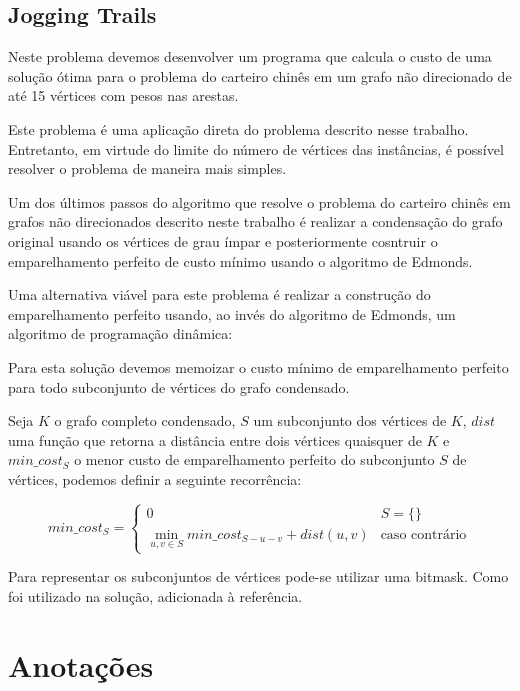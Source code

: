 \documentclass[12pt, a4paper]{article}
\begin{document}
        \subsection{Jogging Trails}
        
        Neste problema\cite{jogging} devemos desenvolver um programa que calcula o custo de uma solução ótima para o problema do carteiro chinês em um grafo não direcionado de até 15 vértices com pesos nas arestas.

        Este problema é uma aplicação direta do problema descrito nesse trabalho. 
        Entretanto, em virtude do limite do número de vértices das instâncias, é possível resolver o problema de maneira mais simples.

        Um dos últimos passos do algoritmo que resolve o problema do carteiro chinês em grafos não direcionados descrito neste trabalho é realizar a condensação do grafo original usando os vértices de grau ímpar e posteriormente cosntruir o emparelhamento perfeito de custo mínimo usando o algoritmo de Edmonds.

        Uma alternativa viável para este problema é realizar a construção do emparelhamento perfeito usando, ao invés do algoritmo de Edmonds, um algoritmo de programação dinâmica:

         Para esta solução devemos memoizar o custo mínimo de emparelhamento perfeito para todo subconjunto de vértices do grafo condensado.

        Seja $K$ o grafo completo condensado, $S$ um subconjunto dos vértices de $K$, $dist$ uma função que retorna a distância entre dois vértices quaisquer de $K$ e $min\_cost_S$ o menor custo de emparelhamento perfeito do subconjunto $S$ de vértices, podemos definir a seguinte recorrência:

        \[
            min\_cost_S = 
            \begin{cases} 
                0 & S = \{ \} \\
                \min_{u, v \in S} min\_cost_{S - u - v} + dist(u, v) & \text{caso contrário}
            \end{cases}
        \]

        Para representar os subconjuntos de vértices pode-se utilizar uma bitmask.
        Como foi utilizado na solução\cite{jogging-sol}, adicionada à referência.




    \iffalse
        \section{Anotações}
\end{document}
